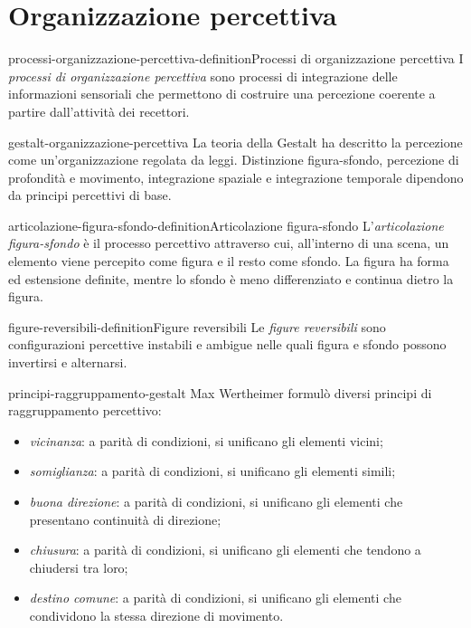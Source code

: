 \documentclass[preview]{standalone}
\begin{document}
\genpage

\section{Organizzazione percettiva}

\begin{snippetdefinition}{processi-organizzazione-percettiva-definition}{Processi di organizzazione percettiva}
    I \emph{processi di organizzazione percettiva} sono processi di integrazione
    delle informazioni sensoriali che permettono di costruire una percezione
    coerente a partire dall'attività dei recettori.
\end{snippetdefinition}

\begin{snippet}{gestalt-organizzazione-percettiva}
    La teoria della Gestalt ha descritto la percezione come un'organizzazione
    regolata da leggi. Distinzione figura-sfondo, percezione di profondità e
    movimento, integrazione spaziale e integrazione temporale dipendono da
    principi percettivi di base.
\end{snippet}

\begin{snippetdefinition}{articolazione-figura-sfondo-definition}{Articolazione figura-sfondo}
    L'\emph{articolazione figura-sfondo} è il processo percettivo attraverso
    cui, all'interno di una scena, un elemento viene percepito come figura e il
    resto come sfondo. La figura ha forma ed estensione definite, mentre lo
    sfondo è meno differenziato e continua dietro la figura.
\end{snippetdefinition}

\begin{snippetdefinition}{figure-reversibili-definition}{Figure reversibili}
    Le \emph{figure reversibili} sono configurazioni percettive instabili e
    ambigue nelle quali figura e sfondo possono invertirsi e alternarsi.
\end{snippetdefinition}

\begin{snippet}{principi-raggruppamento-gestalt}
    Max Wertheimer formulò diversi principi di raggruppamento percettivo:
    \begin{itemize}
        \item \emph{vicinanza}: a parità di condizioni, si unificano gli
        elementi vicini;
        \item \emph{somiglianza}: a parità di condizioni, si unificano gli
        elementi simili;
        \item \emph{buona direzione}: a parità di condizioni, si unificano gli
        elementi che presentano continuità di direzione;
        \item \emph{chiusura}: a parità di condizioni, si unificano gli
        elementi che tendono a chiudersi tra loro;
        \item \emph{destino comune}: a parità di condizioni, si unificano gli
        elementi che condividono la stessa direzione di movimento.
    \end{itemize}
\end{snippet}
\end{document}
